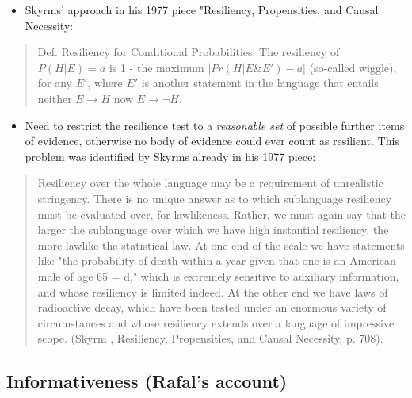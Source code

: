 \documentclass[
  10pt,
  dvipsnames,enabledeprecatedfontcommands]{scrartcl}
\providecommand{\tightlist}{%
  \setlength{\itemsep}{0pt}\setlength{\parskip}{0pt}}
\begin{document}
\begin{itemize}
\tightlist
\item
  Skyrms' approach in his 1977 piece "Resiliency, Propensities, and
  Causal Necessity:
\end{itemize}

\begin{quote}
Def. Resiliency for Conditional Probabilities: The resiliency of $P(H \vert E) = a$ 
is 1 - the maximum $\vert Pr(H \vert E \& E') - a \vert$ (so-called wiggle), for any $E'$, where $E'$ is another statement in the language that entails neither $E \rightarrow H$ now $E \rightarrow \neg H$.
\end{quote}

\begin{itemize}
\tightlist
\item
  Need to restrict the resilience test to a \emph{reasonable set} of
  possible further items of evidence, otherwise no body of evidence
  could ever count as resilient. This problem was identified by Skyrms
  already in his 1977 piece:
\end{itemize}

\begin{quote}
Resiliency over the whole language may be a requirement of unrealistic stringency. There is no unique answer as to which sublanguage resiliency must be evaluated over, for lawlikeness. Rather, we must again say that the larger the sublanguage over which we have high instantial resiliency, the more lawlike the statistical law. At one end of the scale we have statements like "the probability of death within a year given that one is an American male of age 65 = d," which is extremely sensitive to auxiliary information, and whose resiliency is limited indeed. At the other end we have laws of radioactive decay, which have been tested under an enormous variety of circumstances and whose resiliency extends over a language of impressive scope. (Skyrm , Resiliency, Propensities, and Causal Necessity, p. 708).
\end{quote}


\hypertarget{informativeness-rafals-account}{%
\subsection{Informativeness (Rafal's
account)}\label{informativeness-rafals-account}}
\end{document}
